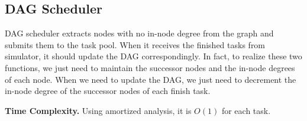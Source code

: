 \subsection{DAG Scheduler}
DAG scheduler extracts nodes with no in-node degree from the graph and submits them to the task pool. When it receives the finished tasks from simulator, it should update the DAG correspondingly. In fact, to realize these two functions, we just need to maintain the successor nodes and the in-node degrees of each node. When we need to update the DAG, we just need to decrement the in-node degree of the successor nodes of each finish task.

\textbf{Time Complexity.} Using amortized analysis, it is $O(1)$ for each task.